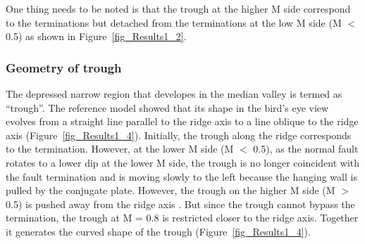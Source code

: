 One thing needs to be noted is that the trough at the higher M side correspond to the terminations but detached from the terminations at the low M side (M $<$ 0.5) as shown in Figure~\hyperref[fig_Results1_2]{\ref{fig_Results1_2}}.

\subsubsection{Geometry of trough}

The depressed narrow region that developes in the median valley is termed as ``trough''. The reference model showed that its shape in the bird's eye view evolves from a straight line parallel to the ridge axis to a line oblique to the ridge axis (Figure~\hyperref[fig_Results1_4]{\ref{fig_Results1_4}}). Initially, the trough along the ridge corresponds to the termination. However, at the lower M side (M $<$ 0.5), as the normal fault rotates to a lower dip at the lower M side, the trough is no longer coincident with the fault termination and is moving slowly to the left because the hanging wall is pulled by the conjugate plate. %
However, the trough on the higher M side (M $>$ 0.5) is pushed away from the ridge axis \citep{Tucholke2008}. But since the trough cannot bypass the termination, the trough at M = 0.8 is restricted closer to the ridge axis. Together it generates the curved shape of the trough (Figure~\hyperref[fig_Results1_4]{\ref{fig_Results1_4}}). 


